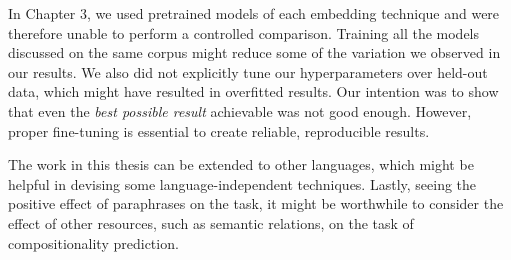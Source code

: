 In Chapter 3, we used pretrained models of each embedding technique and were therefore unable to perform a controlled comparison. Training all the models discussed on the same corpus might reduce some of the variation we observed in our results. We also did not explicitly tune our hyperparameters over held-out data, which might have resulted in overfitted results. Our intention was to show that even the \textit{best possible result} achievable was not good enough. However, proper fine-tuning is essential to create reliable, reproducible results.

The work in this thesis can be extended to other languages, which might be helpful in devising some language-independent techniques. Lastly, seeing the positive effect of paraphrases on the task, it might be worthwhile to consider the effect of other resources, such as semantic relations, on the task of compositionality prediction.